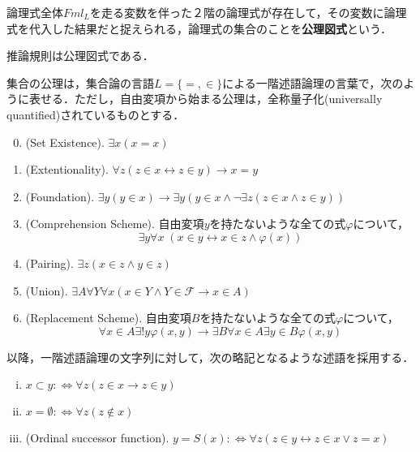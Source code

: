 \documentclass[uplatex,dvipdfmx]{jsreport}
\begin{document}
\begin{definition}
    論理式全体$Fml_L$を走る変数を伴った２階の論理式が存在して，その変数に論理式を代入した結果だと捉えられる，論理式の集合のことを\textbf{公理図式}という．
\end{definition}
\begin{example}
    推論規則は公理図式である．
\end{example}

\begin{shadebox}
    \begin{definition}[集合の公理系ZF]\label{def-ZF-theory}集合の公理は，集合論の言語$L=\{=,\in\}$による一階述語論理の言葉で，次のように表せる．ただし，自由変項から始まる公理は，全称量子化(universally quantified)されているものとする．
        \begin{enumerate}\setcounter{enumi}{-1}
            \item (Set Existence). $\exists x(x=x)$
            \item (Extentionality). $\forall z(z\in x\leftrightarrow z\in y)\rightarrow x=y$
            \item (Foundation). $\exists y(y\in x)\rightarrow\exists y(y\in x\land \lnot\exists z(z\in x\land z\in y))$
            \item (Comprehension Scheme). 自由変項$y$を持たないような全ての式$\varphi$について，
            \[\exists y\forall x\;(x\in y\leftrightarrow x\in z\land\varphi(x))\]
            \item (Pairing). $\exists z(x\in z\land y\in z)$
            \item (Union). $\exists A\forall Y\forall x(x\in Y\land Y\in\mathcal{F}\rightarrow x\in A)$
            \item (Replacement Scheme). 自由変項$B$を持たないような全ての式$\varphi$について，
            \[\forall x\in A\exists!y\varphi(x,y)\rightarrow\exists B\forall x\in A\exists y\in B\varphi(x,y)\]
        \end{enumerate}
        以降，一階述語論理の文字列に対して，次の略記となるような述語を採用する．
        \begin{screen}
            \begin{notation}\mbox{}
                \begin{enumerate}[(i)]
                    \item $x\subset y:\Leftrightarrow\forall z(z\in x\rightarrow z\in y)$
                    \item $x=\emptyset:\Leftrightarrow\forall z(z\notin x)$
                    \item (Ordinal successor function). $y=S(x):\Leftrightarrow\forall z(z\in y\leftrightarrow z\in x\lor z=x)$

\end{enumerate}
\end{notation}
\end{screen}
\end{definition}
\end{shadebox}
\end{document}
